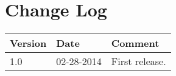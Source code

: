 \documentclass[Main]{subfiles}
\begin{document}
\section*{Change Log}

\begin{table}[H]

\begin{tabular}{p{} p{} p{}}
\hline
\textbf{Version} & \textbf{Date} & \textbf{Comment} \\\hline
1.0 & 02-28-2014 & First release. \\
\hline
\end{tabular}

\end{table}
\end{document}
